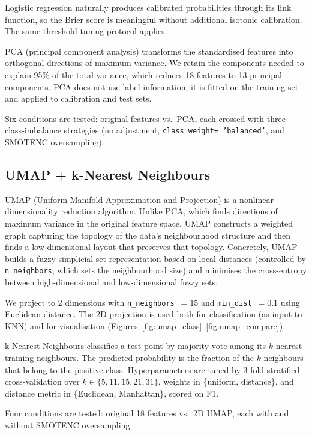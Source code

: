 \documentclass[12pt,a4paper]{article}
\begin{document}
Logistic regression naturally produces calibrated probabilities through
its link function, so the Brier score is meaningful without additional
isotonic calibration. The same threshold-tuning protocol applies.

PCA (principal component analysis) transforms the standardised features
into orthogonal directions of maximum variance. We retain the components
needed to explain 95\% of the total variance, which reduces 18 features
to 13 principal components. PCA does not use label information; it is
fitted on the training set and applied to calibration and test sets.

Six conditions are tested: original features vs.\ PCA, each crossed with
three class-imbalance strategies (no adjustment, \texttt{class\_weight=
'balanced'}, and SMOTENC oversampling).

\subsection{UMAP + k-Nearest Neighbours}

UMAP (Uniform Manifold Approximation and Projection) is a nonlinear
dimensionality reduction algorithm. Unlike PCA, which finds directions of
maximum variance in the original feature space, UMAP constructs a
weighted graph capturing the topology of the data's neighbourhood structure
and then finds a low-dimensional layout that preserves that topology.
Concretely, UMAP builds a fuzzy simplicial set representation based on local
distances (controlled by \texttt{n\_neighbors}, which sets the neighbourhood
size) and minimises the cross-entropy between high-dimensional and
low-dimensional fuzzy sets.

We project to 2 dimensions with \texttt{n\_neighbors}~$= 15$ and
\texttt{min\_dist}~$= 0.1$ using Euclidean distance. The 2D projection is
used both for classification (as input to KNN) and for visualisation
(Figures~\ref{fig:umap_class}--\ref{fig:umap_compare}).

k-Nearest Neighbours classifies a test point by majority vote among its
$k$ nearest training neighbours. The predicted probability is the fraction
of the $k$ neighbours that belong to the positive class. Hyperparameters
are tuned by 3-fold stratified cross-validation over $k \in \{5, 11, 15, 21,
31\}$, weights in \{uniform, distance\}, and distance metric in
\{Euclidean, Manhattan\}, scored on F1.

Four conditions are tested: original 18 features vs.\ 2D UMAP, each with
and without SMOTENC oversampling.
\end{document}
